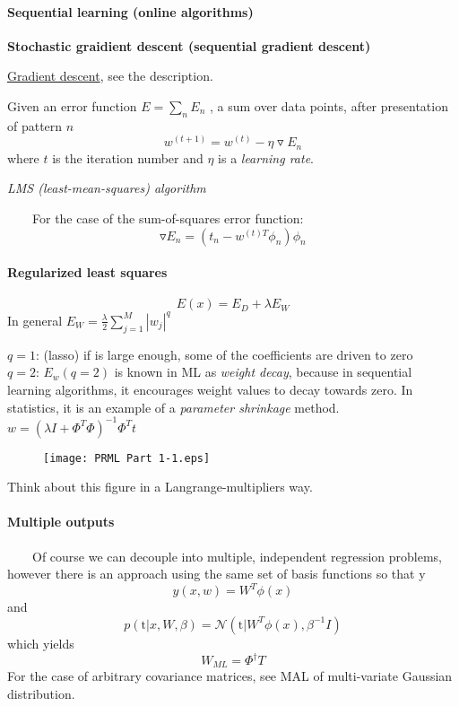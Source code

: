 \documentclass{article}
\newcommand{\tmem}[1]{{\em #1\/}}
\newcommand{\tmtextbf}[1]{{\bfseries{#1}}}
\begin{document}
\paragraph{Sequential learning (online algorithms)}\label{header-n55}

\tmtextbf{Stochastic graidient descent (sequential gradient descent)}

\href{https://en.wikipedia.org/wiki/Gradient_descent}{Gradient descent}, see
the description.

Given an error function $E = \sum_n E_n$ , a sum over data points, after
presentation of pattern $n$\\

\[ w^{(t + 1)} = w^{(t)} - \eta \triangledown E_n \]
where $t$ is the iteration number and $\eta$ is a {\tmem{learning rate}}.

{\tmem{LMS (least-mean-squares) algorithm}}

$\quad \quad$For the case of the sum-of-squares error function:
\[ \triangledown E_n = (t_n - w^{(t) T} \phi_n) \phi_n \]
\paragraph{Regularized least squares}\label{header-n70}
\[ E (x) = E_D + \lambda E_W \]
In general $E_W = \frac{\lambda}{2} \sum^M_{j = 1} |w_j |^q$

$q = 1$: (lasso) if is large enough, some of the coefficients are driven to
zero\\
$q = 2$: $E_w  (q = 2)$ is known in ML as {\tmem{weight decay}}, because in
sequential learning algorithms, it encourages weight values to decay towards
zero. In statistics, it is an example of a {\tmem{parameter shrinkage}}
method. $w = (\lambda I + \Phi^T \Phi)^{- 1} \Phi^T t$

\begin{figure}[h]
  \begin{center}
    \texttt{[image: PRML Part 1-1.eps]} 
  \end{center}
  \caption{}
\end{figure}

Think about this figure in a Langrange-multipliers way.

\paragraph{Multiple outputs}\label{header-n81}

$\quad \quad$Of course we can decouple into multiple, independent regression
problems, however there is an approach using the same set of basis functions
so that y
\[ y (x, w) = W^T \phi (x) \]
and
\[ p (\mathrm{t} |x, W, \beta) = \mathcal{N} (\mathrm{t} |W^T \phi (x),
   \beta^{- 1} I) \]
which yields
\[ W_{ML} = \Phi^{\dagger} T \]
For the case of arbitrary covariance matrices, see MAL of multi-variate
Gaussian distribution.
\end{document}
